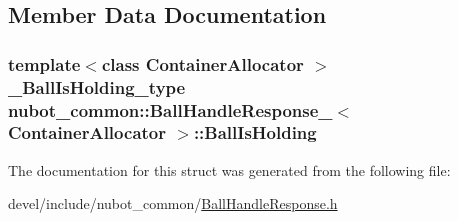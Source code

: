 \subsection{Member Data Documentation}
\hypertarget{structnubot__common_1_1BallHandleResponse___a7a94fe09f1ce27bdeafd48ac620390a2}{
\subsubsection[{Ball\-Is\-Holding}]{\setlength{\rightskip}{0pt plus 5cm}template$<$class Container\-Allocator $>$ {\bf \-\_\-\-Ball\-Is\-Holding\-\_\-type} {\bf nubot\-\_\-common\-::\-Ball\-Handle\-Response\-\_\-}$<$ Container\-Allocator $>$\-::Ball\-Is\-Holding}}\label{structnubot__common_1_1BallHandleResponse___a7a94fe09f1ce27bdeafd48ac620390a2}


The documentation for this struct was generated from the following file\-:\begin{DoxyCompactItemize}
\item 
devel/include/nubot\-\_\-common/\hyperlink{BallHandleResponse_8h}{Ball\-Handle\-Response.\-h}\end{DoxyCompactItemize}
